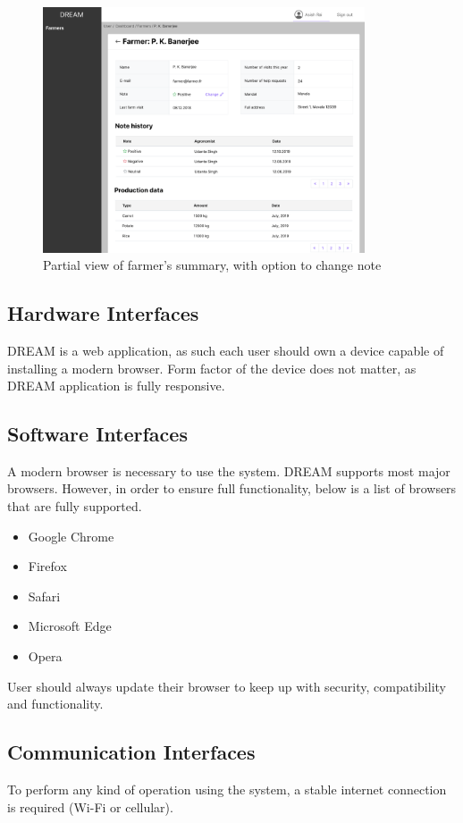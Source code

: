 \begin{figure}[H]
\centering
\includegraphics[width=0.85\textwidth]{mockups/Policy maker_Dashboard_Farmers_Farmer_part1.png}
\caption{Partial view of farmer's summary, with option to change note}
\end{figure}

\subsection{Hardware Interfaces}
DREAM is a web application, as such each user should own a device capable of installing a modern browser. Form factor of the device does not matter, as DREAM application is fully responsive.

\subsection{Software Interfaces}
A modern browser is necessary to use the system. DREAM supports most major browsers. However, in order to ensure full functionality, below is a list of browsers that are fully supported.
\begin{itemize}
    \setlength\itemsep{0em}
    \item Google Chrome
    \item Firefox
    \item Safari
    \item Microsoft Edge
    \item Opera
\end{itemize}
User should always update their browser to keep up with security, compatibility and functionality.

\subsection{Communication Interfaces}
To perform any kind of operation using the system, a stable internet connection is required (Wi-Fi or cellular).

